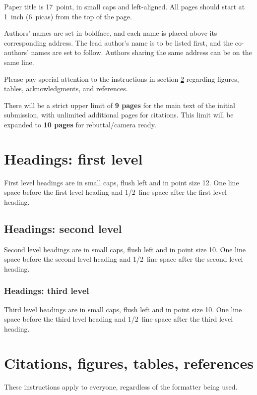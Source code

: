 \documentclass{article} %
\theoremstyle{plain}
\theoremstyle{definition}
\theoremstyle{remark}
\begin{document}
Paper title is 17~point, in small caps and left-aligned.
All pages should start at 1~inch (6~picas) from the top of the page.

Authors' names are
set in boldface, and each name is placed above its corresponding
address. The lead author's name is to be listed first, and
the co-authors' names are set to follow. Authors sharing the
same address can be on the same line.

Please pay special attention to the instructions in section \ref{others}
regarding figures, tables, acknowledgments, and references.


There will be a strict upper limit of \textbf{9 pages} for the main text of the initial submission, with unlimited additional pages for citations. This limit will be expanded to \textbf{10 pages} for rebuttal/camera ready.

\section{Headings: first level}
\label{headings}

First level headings are in small caps,
flush left and in point size 12. One line space before the first level
heading and 1/2~line space after the first level heading.

\subsection{Headings: second level}

Second level headings are in small caps,
flush left and in point size 10. One line space before the second level
heading and 1/2~line space after the second level heading.

\subsubsection{Headings: third level}

Third level headings are in small caps,
flush left and in point size 10. One line space before the third level
heading and 1/2~line space after the third level heading.

\section{Citations, figures, tables, references}
\label{others}

These instructions apply to everyone, regardless of the formatter being used.
\end{document}
